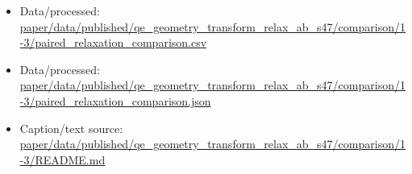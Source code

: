 \begin{itemize}[leftmargin=1.4em,noitemsep]
\item Data/processed: \begingroup\scriptsize\url{paper/data/published/qe_geometry_transform_relax_ab_s47/comparison/1-3/paired_relaxation_comparison.csv}\endgroup
\item Data/processed: \begingroup\scriptsize\url{paper/data/published/qe_geometry_transform_relax_ab_s47/comparison/1-3/paired_relaxation_comparison.json}\endgroup
\item Caption/text source: \begingroup\scriptsize\url{paper/data/published/qe_geometry_transform_relax_ab_s47/comparison/1-3/README.md}\endgroup
\end{itemize}
